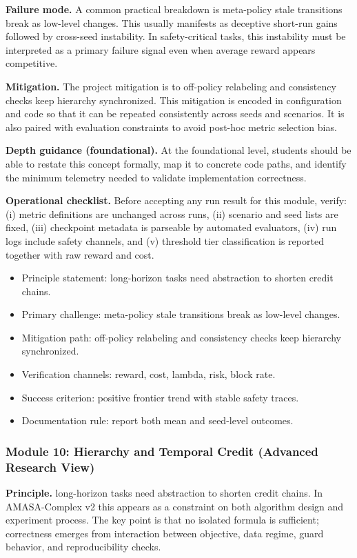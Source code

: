 \documentclass[conference]{IEEEtran}
\begin{document}
\textbf{Failure mode.} A common practical breakdown is meta-policy stale transitions break as low-level changes. This usually manifests as deceptive short-run gains followed by cross-seed instability. In safety-critical tasks, this instability must be interpreted as a primary failure signal even when average reward appears competitive.

\textbf{Mitigation.} The project mitigation is to off-policy relabeling and consistency checks keep hierarchy synchronized. This mitigation is encoded in configuration and code so that it can be repeated consistently across seeds and scenarios. It is also paired with evaluation constraints to avoid post-hoc metric selection bias.

\textbf{Depth guidance (foundational).} At the foundational level, students should be able to restate this concept formally, map it to concrete code paths, and identify the minimum telemetry needed to validate implementation correctness.

\textbf{Operational checklist.} Before accepting any run result for this module, verify: (i) metric definitions are unchanged across runs, (ii) scenario and seed lists are fixed, (iii) checkpoint metadata is parseable by automated evaluators, (iv) run logs include safety channels, and (v) threshold tier classification is reported together with raw reward and cost.

\begin{itemize}[leftmargin=*]
  \item Principle statement: long-horizon tasks need abstraction to shorten credit chains.
  \item Primary challenge: meta-policy stale transitions break as low-level changes.
  \item Mitigation path: off-policy relabeling and consistency checks keep hierarchy synchronized.
  \item Verification channels: reward, cost, lambda, risk, block rate.
  \item Success criterion: positive frontier trend with stable safety traces.
  \item Documentation rule: report both mean and seed-level outcomes.
\end{itemize}


\subsubsection{Module 10: Hierarchy and Temporal Credit (Advanced Research View)}
\textbf{Principle.} long-horizon tasks need abstraction to shorten credit chains. In AMASA-Complex v2 this appears as a constraint on both algorithm design and experiment process. The key point is that no isolated formula is sufficient; correctness emerges from interaction between objective, data regime, guard behavior, and reproducibility checks.
\end{document}
